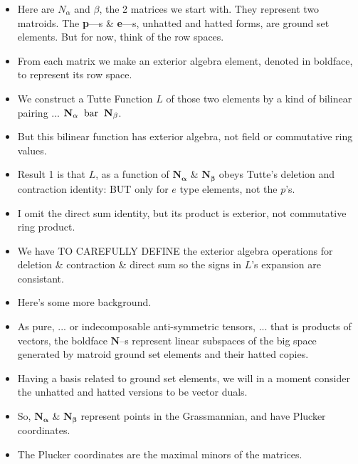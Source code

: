 \documentclass[14pt]{extarticle}
\begin{document}
{\bf
  \begin{itemize}
  \item Here are $N_\alpha$ and $\beta$, the 2 matrices we start with.
    They represent two matroids.  The \textbf{p}---s \&
    \textbf{e}---s, unhatted and hatted forms, are ground set elements.
    But for now, think of the row spaces.

  \item From each matrix we make an exterior algebra element, denoted in boldface,
    to represent its row space.

  \item We construct a Tutte Function $L$ of those two elements by a
    kind of bilinear pairing ... 
  $\mathbf{N_\alpha} \text{\;\;bar\;\;} \mathbf{N_\beta}$.

\item But this bilinear function has exterior algebra, not field or commutative ring values. 

\item Result 1 is that $L$, as a function of $\mathbf{N_\alpha}$ \&
  $\mathbf{N_\beta}$ obeys Tutte's deletion and contraction identity:  BUT
  only for $e$ type elements, not the $p$'s.

\item I omit the direct sum identity, but its product is exterior, not
  commutative ring product.

\item We have TO CAREFULLY DEFINE the exterior algebra operations for deletion \&
  contraction \& direct sum so the signs in $L$'s expansion are consistant.

\item Here's some more background.
  
\item
  As pure, ... or indecomposable anti-symmetric tensors, ... that is 
  products of vectors, the boldface
  $\mathbf{N}$--s represent linear subspaces of the big space generated
  by matroid ground set elements and their hatted copies.  

\item  Having a basis related to ground set elements, we will in a moment
  consider the unhatted and hatted versions to be vector duals.

\item
  So, $\mathbf{N_\alpha}$ \& $\mathbf{N_\beta}$ represent points in the
  Grassmannian, and have Plucker coordinates.

\item
  The Plucker coordinates are the maximal minors of the matrices.


\end{itemize}}
\end{document}
